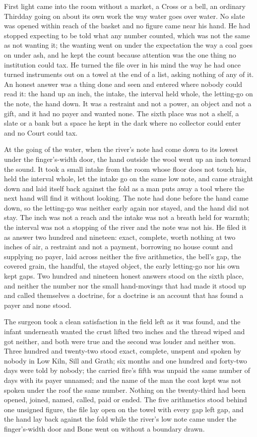 First light came into the room without a market, a Cross or a bell, an ordinary Thirdday going on about its own work the way water goes over water. No slate was opened within reach of the basket and no figure came near his hand. He had stopped expecting to be told what any number counted, which was not the same as not wanting it; the wanting went on under the expectation the way a coal goes on under ash, and he kept the count because attention was the one thing no institution could tax. He turned the file over in his mind the way he had once turned instruments out on a towel at the end of a list, asking nothing of any of it. An honest answer was a thing done and seen and entered where nobody could read it: the hand up an inch, the intake, the interval held whole, the letting-go on the note, the hand down. It was a restraint and not a power, an object and not a gift, and it had no payer and wanted none. The sixth place was not a shelf, a slate or a bank but a space he kept in the dark where no collector could enter and no Court could tax.

At the going of the water, when the river's note had come down to its lowest under the finger's-width door, the hand outside the wool went up an inch toward the sound. It took a small intake from the room whose floor does not touch his, held the interval whole, let the intake go on the same low note, and came straight down and laid itself back against the fold as a man puts away a tool where the next hand will find it without looking. The note had done before the hand came down, so the letting-go was neither early again nor stayed, and the hand did not stay. The inch was not a reach and the intake was not a breath held for warmth; the interval was not a stopping of the river and the note was not his. He filed it as answer two hundred and nineteen: exact, complete, worth nothing at two inches of air, a restraint and not a payment, borrowing no house count and supplying no payer, laid across neither the five arithmetics, the bell's gap, the covered grain, the handful, the stayed object, the early letting-go nor his own kept gaps. Two hundred and nineteen honest answers stood on the sixth place, and neither the number nor the small hand-movings that had made it stood up and called themselves a doctrine, for a doctrine is an account that has found a payer and none stood.

The surgeon took a clean satisfaction in the field left as it was found, and the infant underneath wanted the crust lifted two inches and the thread wiped and got neither, and both were true and the second was louder and neither won. Three hundred and twenty-two stood exact, complete, unspent and spoken by nobody in Low Kiln, Sill and Grath; six months and one hundred and forty-two days were told by nobody; the carried fire's fifth was unpaid the same number of days with its payer unnamed; and the name of the man the coat kept was not spoken under the roof the same number. Nothing on the twenty-third had been opened, joined, named, called, paid or ended. The five arithmetics stood behind one unsigned figure, the file lay open on the towel with every gap left gap, and the hand lay back against the fold while the river's low note came under the finger's-width door and Bone went on without a boundary drawn.
